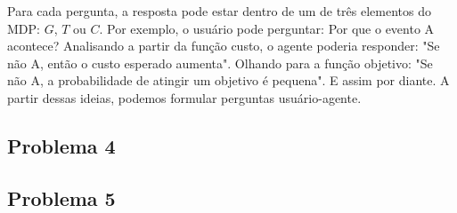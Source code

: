 \documentclass{article}
\begin{document}
Para cada pergunta, a resposta pode estar dentro de um de três elementos do MDP: $G$, $T$ ou $C$. Por exemplo, o usuário pode perguntar: Por que o evento A acontece? Analisando a partir da função custo, o agente poderia responder: "Se não A, então o custo esperado aumenta". Olhando para a função objetivo: "Se não A, a probabilidade de atingir um objetivo é pequena". E assim por diante. A partir dessas ideias, podemos formular perguntas usuário-agente.

\subsection{Problema 4}

\begin{center}
\end{center}


\subsection{Problema 5}

\begin{center}
\end{center}
\end{document}
